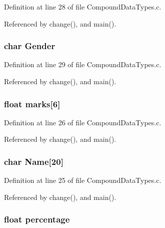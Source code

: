 Definition at line 28 of file Compound\+Data\+Types.\+c.



Referenced by change(), and main().

\hypertarget{structmember_afbcfc79081bb5d32e3e787e11b880fda}{
\subsubsection[{Gender}]{\setlength{\rightskip}{0pt plus 5cm}char Gender}}\label{structmember_afbcfc79081bb5d32e3e787e11b880fda}


Definition at line 29 of file Compound\+Data\+Types.\+c.



Referenced by change(), and main().

\hypertarget{structmember_ad4c3e5c25307fd49af034db07064803a}{
\subsubsection[{marks}]{\setlength{\rightskip}{0pt plus 5cm}float marks\mbox{[}6\mbox{]}}}\label{structmember_ad4c3e5c25307fd49af034db07064803a}


Definition at line 26 of file Compound\+Data\+Types.\+c.



Referenced by change(), and main().

\hypertarget{structmember_a2053e4d21d9f2f5158910a2977224749}{
\subsubsection[{Name}]{\setlength{\rightskip}{0pt plus 5cm}char Name\mbox{[}20\mbox{]}}}\label{structmember_a2053e4d21d9f2f5158910a2977224749}


Definition at line 25 of file Compound\+Data\+Types.\+c.



Referenced by change(), and main().

\hypertarget{structmember_a34c5b668208550b3c34a2ed0eec615f5}{
\subsubsection[{percentage}]{\setlength{\rightskip}{0pt plus 5cm}float percentage}}\label{structmember_a34c5b668208550b3c34a2ed0eec615f5}



